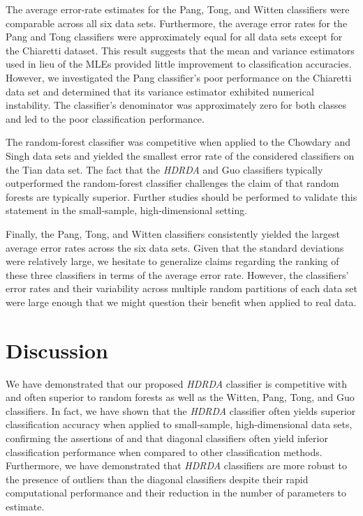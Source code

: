 \documentclass[]{interact}\usepackage[]{graphicx}\usepackage[]{color}
\begin{document}
The average error-rate estimates for the Pang, Tong, and Witten classifiers were
comparable across all six data sets. Furthermore, the average error rates for
the Pang and Tong classifiers were approximately equal for all data sets except
for the Chiaretti dataset. This result suggests that the mean and variance
estimators used in lieu of the MLEs provided little improvement to
classification accuracies. However, we investigated the Pang classifier's poor
performance on the Chiaretti data set and determined that its variance estimator
exhibited numerical instability. The classifier's denominator was approximately
zero for both classes and led to the poor classification performance.

The random-forest classifier was competitive when applied to the Chowdary and
Singh data sets and yielded the smallest error rate of the considered
classifiers on the Tian data set. The fact that the \emph{HDRDA} and Guo
classifiers typically outperformed the random-forest classifier challenges the
claim of \cite{FernandezDelgado:2014ul} that random forests are typically
superior. Further studies should be performed to validate this statement in the
small-sample, high-dimensional setting.

Finally, the Pang, Tong, and Witten classifiers consistently yielded the largest
average error rates across the six data sets. Given that the standard deviations
were relatively large, we hesitate to generalize claims regarding the ranking of
these three classifiers in terms of the average error rate. However, the
classifiers' error rates and their variability across multiple random partitions
of each data set were large enough that we might question their benefit when
applied to real data.

\section{Discussion}
\label{sec:discussion}

We have demonstrated that our proposed \emph{HDRDA} classifier is competitive
with and often superior to random forests as well as the Witten, Pang, Tong, and
Guo classifiers. In fact, we have shown that the \emph{HDRDA} classifier often
yields superior classification accuracy when applied to small-sample,
high-dimensional data sets, confirming the assertions of \cite{Mai:2012bf} and
\cite{Fan:2012iq} that diagonal classifiers often yield inferior classification
performance when compared to other classification methods. Furthermore, we have
demonstrated that \emph{HDRDA} classifiers are more robust to the presence of
outliers than the diagonal classifiers despite their rapid computational
performance and their reduction in the number of parameters to estimate.
\end{document}
